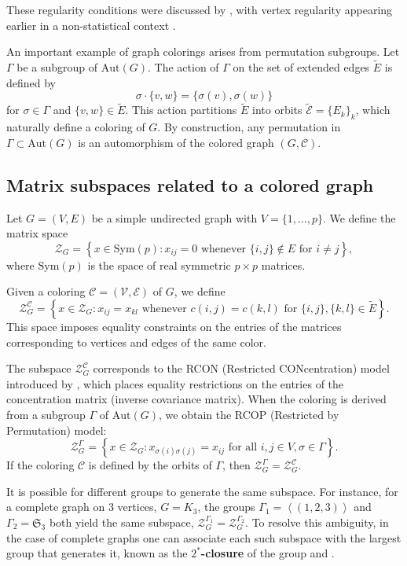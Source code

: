\documentclass[12pt]{amsart}
\theoremstyle{plain}
\theoremstyle{definition}
\theoremstyle{remark}
\newcommand{\1}{\mathbf{1}}
\newcommand{\coloredZ}{\mathcal{Z}_{G}^{\mathcal{C}}}
\begin{document}
These regularity conditions were discussed by \citet{GeLau2012}, with vertex regularity appearing earlier in a non-statistical context \citep{Siemons83,Sachs}.

An important example of graph colorings arises from permutation subgroups.  Let $\Gamma$ be a subgroup of $\mathrm{Aut}(G)$. The action of $\Gamma$ on the set of extended edges $\tilde{E}$ is defined by 
\[
\sigma\cdot\{v,w\} = \{\sigma(v),\sigma(w)\}
\]
for $\sigma\in\Gamma$ and $\{v,w\}\in \tilde{E}$. This action partitions $\tilde{E}$ into orbits $\tilde{\mathcal{E}}=\{E_k\}_k$, which naturally define a coloring of $G$. By construction, any permutation in $\Gamma\subset\mathrm{Aut}(G)$ is an automorphism of the colored graph $(G,\mathcal{C})$. 


\subsection{Matrix subspaces related to a colored graph}\label{sec:matrix_subspaces}

Let $G=(V,E)$ be a simple undirected graph with $V=\{1,\ldots,p\}$. We define the matrix space
\[
\mathcal{Z}_G = \left\{ x\in\mathrm{Sym}(p)\colon x_{ij}=0\mbox{ whenever } \{i,j\}\notin E\mbox{ for }i\neq j\right\}, 
\]
where $\mathrm{Sym}(p)$ is the space of real symmetric $p\times p$ matrices.

Given a coloring $\mathcal{C}=(\mathcal{V},\mathcal{E})$ of $G$, we define
\[
\mathcal{Z}_G^{\mathcal{C}} = \left\{ x\in\mathcal{Z}_G \colon x_{ij}=x_{kl}\mbox{ whenever } c(i,j) = c(k,l) \mbox{ for }\{i,j\},\{k,l\}\in\tilde{E}\right\}. 
\]
This space imposes equality constraints on the entries of the matrices corresponding to vertices and edges of the same color. 

The subspace $\coloredZ$ corresponds to the RCON (Restricted CONcentration) model introduced by \citet{HL08}, which places equality restrictions on the entries of the concentration matrix (inverse covariance matrix).
When the coloring is derived from a subgroup $\Gamma$ of $\mathrm{Aut}(G)$, we obtain the RCOP (Restricted by Permutation) model: 
\[
\mathcal{Z}_G^{\Gamma} = \left\{ x\in\mathcal{Z}_G \colon   x_{\sigma(i)\sigma(j)}=x_{ij}\mbox{ for all }i,j\in V, \sigma\in\Gamma\right\}. 
\] 
If the coloring $\mathcal{C}$ is defined by the orbits of $\Gamma$, then $\mathcal{Z}_G^{\Gamma} = \mathcal{Z}_G^{\mathcal{C}}$. 

It is possible for different groups to generate the same subspace.  For instance, for a complete graph on $3$ vertices, $G=K_3$, the groups $\Gamma_1=\left<(1,2,3)\right>$ and $\Gamma_2=\mathfrak{S}_3$ both yield the same subspace, $\mathcal{Z}_{G}^{\Gamma_1} = \mathcal{Z}_{G}^{\Gamma_2}$. 
To resolve this ambiguity, in the case of complete graphs one can associate each such subspace with the largest group that generates it, known as the \textbf{$2^\ast$-closure} of the group \citep{Wielandt,Siemons82,Siemons83} and \citep[p.~1502]{Comb}.
\end{document}
